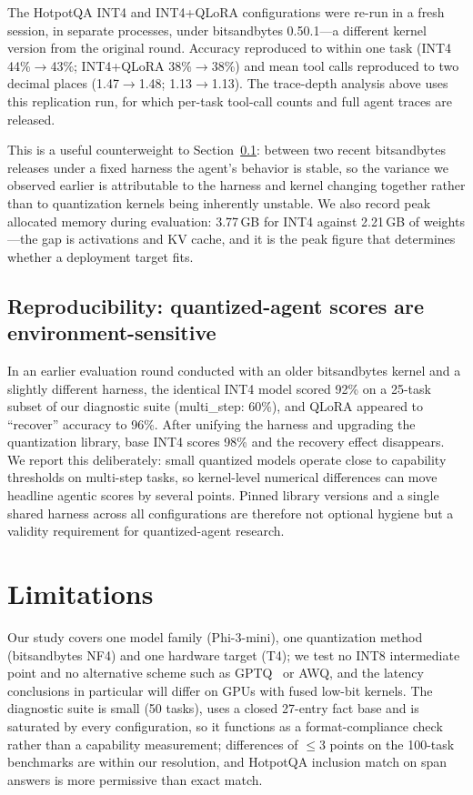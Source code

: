 \documentclass{article}
\begin{document}
The HotpotQA INT4 and INT4+QLoRA configurations were re-run in a fresh
session, in separate processes, under bitsandbytes 0.50.1---a different
kernel version from the original round. Accuracy reproduced to within one
task (INT4 44\%$\rightarrow$43\%; INT4+QLoRA 38\%$\rightarrow$38\%) and mean
tool calls reproduced to two decimal places (1.47$\rightarrow$1.48;
1.13$\rightarrow$1.13). The trace-depth analysis above uses this replication
run, for which per-task tool-call counts and full agent traces are released.

This is a useful counterweight to Section~\ref{sec:repro}: between two recent
bitsandbytes releases under a fixed harness the agent's behavior is stable, so
the variance we observed earlier is attributable to the harness and kernel
changing together rather than to quantization kernels being inherently
unstable. We also record peak allocated memory during evaluation: 3.77\,GB for
INT4 against 2.21\,GB of weights---the gap is activations and KV cache, and it
is the peak figure that determines whether a deployment target fits.

\subsection{Reproducibility: quantized-agent scores are environment-sensitive}
\label{sec:repro}

In an earlier evaluation round conducted with an older bitsandbytes
kernel and a slightly different harness, the identical INT4 model scored
92\% on a 25-task subset of our diagnostic suite (multi\_step: 60\%),
and QLoRA appeared to ``recover'' accuracy to 96\%. After unifying the
harness and upgrading the quantization library, base INT4 scores 98\%
and the recovery effect disappears. We report this deliberately: small
quantized models operate close to capability thresholds on multi-step
tasks, so kernel-level numerical differences can move headline agentic
scores by several points. Pinned library versions and a single shared
harness across all configurations are therefore not optional hygiene but
a validity requirement for quantized-agent research.

\section{Limitations}
\label{sec:limitations}

Our study covers one model family (Phi-3-mini), one quantization method
(bitsandbytes NF4) and one hardware target (T4); we test no INT8 intermediate
point and no alternative scheme such as GPTQ~\cite{frantar2023gptq} or AWQ,
and the latency conclusions in particular will differ on GPUs with fused
low-bit kernels. The diagnostic suite is small (50 tasks), uses a closed
27-entry fact base and is saturated by every configuration, so it functions as
a format-compliance check rather than a capability measurement; differences of
$\le$3 points on the 100-task benchmarks are within our resolution, and
HotpotQA inclusion match on span answers is more permissive than exact match.
\end{document}
